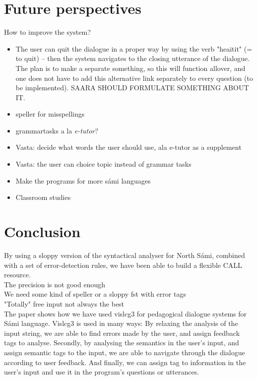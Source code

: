 \documentclass[11pt]{article}
\begin{document}
 

\section{Future perspectives}
How to improve the system?
\begin{itemize}
\setlength{\itemsep}{-0.2cm}
\item The user can quit the dialogue in a proper way by using the verb "heaitit" (= to quit) -- then the system navigates to the closing utterance of the dialogue. The plan is to make a separate something, so this will function allover, and one does not have to add this alternative link separately to every question (to be implemented). SAARA SHOULD FORMULATE SOMETHING ABOUT IT. 
\item  speller for misspellings
\item  grammartasks a la \textit{e-tutor}?
\item  Vasta: decide what words the user should use, ala e-tutor as a supplement
\item  Vasta: the user can choice topic instead of grammar tasks
\item  Make the programs for more sámi languages
\item  Classroom studies 
\end{itemize}

\section{Conclusion}

By using a sloppy version of the syntactical analyser for North Sámi, combined with a set of error-detection rules, we have been able to build a flexible CALL resource. \\ 
The precision is not good enough  \\
We need some kind of speller or a sloppy fst with error tags \\
"Totally" free input not always the best \\




The paper shows how we have used vislcg3 for pedagogical dialogue systems for Sámi language. Vislcg3 is used in many ways: By relaxing the analysis of the input string, we are able to find errors made by the user, and assign feedback tags to analyse. Secondly, by analysing the semantics in the user's input, and assign semantic tags to the input, we are able to navigate through the dialogue according to user feedback. And finally, we can assign tag to information in the user's input and use it in the program's questions or utterances.  
\end{document}

